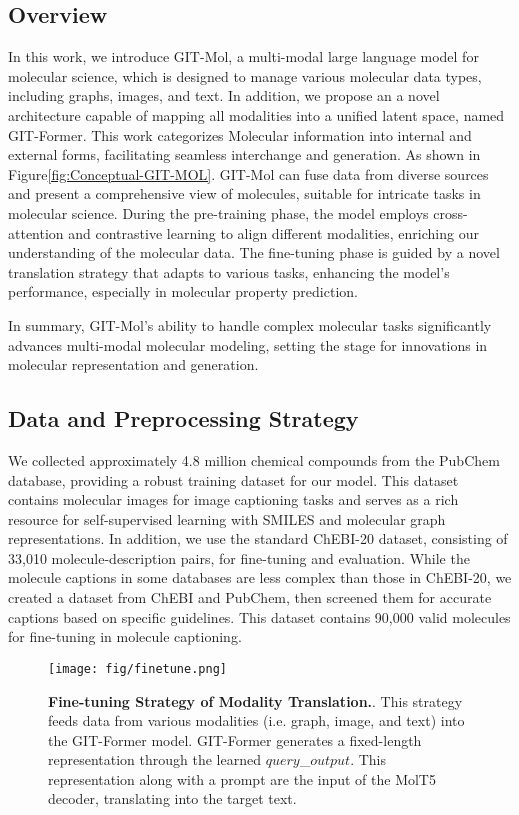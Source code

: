 \documentclass{article}
\begin{document}
\subsection{Overview}
In this work, we introduce GIT-Mol, a multi-modal large language model for molecular science, which is designed to manage various molecular data types, including graphs, images, and text. In addition, we propose an a novel architecture capable of mapping all modalities into a unified latent space, named GIT-Former. This work categorizes Molecular information into internal and external forms, facilitating seamless interchange and generation. As shown in Figure\ref{fig:Conceptual-GIT-MOL}. GIT-Mol can fuse data from diverse sources and present a comprehensive view of molecules, suitable for intricate tasks in molecular science. During the pre-training phase, the model employs cross-attention and contrastive learning to align different modalities, enriching our understanding of the molecular data. The fine-tuning phase is guided by a novel translation strategy that adapts to various tasks, enhancing the model's performance, especially in molecular property prediction.

In summary, GIT-Mol's ability to handle complex molecular tasks significantly advances multi-modal molecular modeling, setting the stage for innovations in molecular representation and generation.

\subsection{Data and Preprocessing Strategy}


We collected approximately 4.8 million chemical compounds from the PubChem\cite{kim2019pubchem} database, providing a robust training dataset for our model. This dataset contains molecular images for image captioning tasks and serves as a rich resource for self-supervised learning with SMILES and molecular graph representations.
In addition, we use the standard ChEBI-20 dataset\cite{edwards2021text2mol}, consisting of 33,010 molecule-description pairs, for fine-tuning and evaluation. While the molecule captions in some databases are less complex than those in ChEBI-20, we created a dataset from ChEBI\cite{hastings2016chebi} and PubChem, then screened them for accurate captions based on specific guidelines. This dataset contains 90,000 valid molecules for fine-tuning in molecule captioning.

\begin{figure*}[t!]
\centering
\texttt{[image: fig/finetune.png]}
\caption{\textbf{Fine-tuning Strategy of Modality Translation.}. This strategy feeds data from various modalities (i.e. graph, image, and text) into the GIT-Former model. GIT-Former generates a fixed-length representation through the learned $query$\_$output$. This representation along with a prompt are the input of the MolT5 decoder, translating into the target text.}
\label{fig: finetune Strategy}
\end{figure*}
\end{document}
